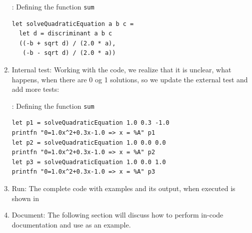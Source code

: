 \documentclass[fsharpNotes.tex]{subfiles}
\begin{document}
\begin{enumerate}
\begin{codeNOutput}[label=solveQuadraticEquationImplementation,
  top=-5pt,
  bottom=-5pt,
  left=-2pt,
  right=-2pt,
]{: Defining the function \lstinline{sum}}
\begin{lstlisting}
let solveQuadraticEquation a b c =
  let d = discriminant a b c
  ((-b + sqrt d) / (2.0 * a),
   (-b - sqrt d) / (2.0 * a))
\end{lstlisting}
\end{codeNOutput}
\item Internal test: Working with the code, we realize that it is unclear, what happens, when there are 0 og 1 solutions, so we update the external test and add more tests:
\begin{codeNOutput}[label=solveQuadraticEquationTest,
  top=-5pt,
  bottom=-5pt,
  left=-2pt,
  right=-2pt,
]{: Defining the function \lstinline{sum}}
\begin{lstlisting}
let p1 = solveQuadraticEquation 1.0 0.3 -1.0
printfn "0=1.0x^2+0.3x-1.0 => x = %A" p1
let p2 = solveQuadraticEquation 1.0 0.0 0.0
printfn "0=1.0x^2+0.3x-1.0 => x = %A" p2
let p3 = solveQuadraticEquation 1.0 0.0 1.0
printfn "0=1.0x^2+0.3x-1.0 => x = %A" p3
\end{lstlisting} 
\end{codeNOutput}
\item Run: The complete code with examples and its output, when executed is shown in 
\item Document: The following section will discuss how to perform in-code documentation and use  as an example.
\end{enumerate}
\end{document}
